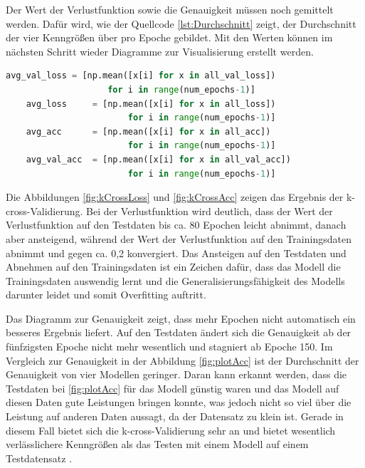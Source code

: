 Der Wert der Verlustfunktion sowie die Genauigkeit müssen noch gemittelt werden. Dafür wird, wie der Quellcode \ref*{lst:Durchschnitt} zeigt, der Durchschnitt 
der vier Kenngrößen über pro Epoche gebildet. Mit den Werten können im nächsten Schritt wieder Diagramme zur Visualisierung erstellt werden.
\begin{lstlisting}[language = python, caption={Mitteln der Ergebnisse \cite{DL_PY}},captionpos=b, label = lst:Durchschnitt, floatplacement=H]
    avg_val_loss = [np.mean([x[i] for x in all_val_loss])
                    for i in range(num_epochs-1)]
    avg_loss     = [np.mean([x[i] for x in all_loss])
                        for i in range(num_epochs-1)]
    avg_acc      = [np.mean([x[i] for x in all_acc])
                        for i in range(num_epochs-1)]
    avg_val_acc  = [np.mean([x[i] for x in all_val_acc])
                        for i in range(num_epochs-1)]
\end{lstlisting}
Die Abbildungen \ref*{fig:kCrossLoss} und \ref*{fig:kCrossAcc} zeigen das Ergebnis der k-cross-Validierung. Bei der Verlustfunktion wird deutlich, dass
der Wert der Verlustfunktion auf den Testdaten bis ca. 80 Epochen leicht abnimmt, danach aber ansteigend, während der Wert der Verlustfunktion 
auf den Trainingsdaten abnimmt und gegen ca. 0,2 konvergiert. Das Ansteigen auf den Testdaten und Abnehmen auf den Trainingsdaten ist ein Zeichen dafür,
dass das Modell die Trainingsdaten auswendig lernt und die Generalisierungsfähigkeit des Modells darunter leidet und somit Overfitting auftritt.

Das Diagramm zur Genauigkeit zeigt, dass mehr Epochen nicht automatisch ein besseres Ergebnis liefert. Auf den Testdaten ändert sich die Genauigkeit 
ab der fünfzigsten Epoche nicht mehr wesentlich und stagniert ab Epoche 150. Im Vergleich zur Genauigkeit in der Abbildung \ref*{fig:plotAcc} 
ist der Durchschnitt der Genauigkeit von vier Modellen geringer. Daran kann erkannt werden, dass die Testdaten bei \ref*{fig:plotAcc} für das Modell günstig 
waren und das Modell auf diesen Daten gute Leistungen bringen konnte, was jedoch nicht so viel über die Leistung auf anderen Daten aussagt, da der Datensatz zu klein ist. 
Gerade in diesem Fall bietet sich die k-cross-Validierung sehr an und bietet wesentlich verlässlichere Kenngrößen als das Testen mit einem Modell auf einem 
Testdatensatz \cite[vgl. S.123]{DL_PY}.

